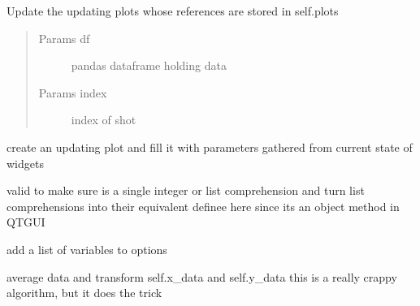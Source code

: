 \documentclass[letterpaper,10pt,english]{sphinxmanual}
\begin{document}
\begin{fulllineitems}

\begin{fulllineitems}
\label{VisualPlotter:Visualplotterwidget.VisualPlotter.update_plots}
Update the updating plots whose references are stored in self.plots
\begin{quote}\begin{description}
\item[{Params df}] \leavevmode
pandas dataframe holding data

\item[{Params index}] \leavevmode
index of shot

\end{description}\end{quote}

\end{fulllineitems}


\begin{fulllineitems}
\label{VisualPlotter:Visualplotterwidget.VisualPlotter.updating_plot}
create an updating plot and fill it with parameters 
gathered from current state of widgets

\end{fulllineitems}


\begin{fulllineitems}
\label{VisualPlotter:Visualplotterwidget.VisualPlotter.validate}
valid to make sure is a single integer or list comprehension
and turn list comprehensions into their equivalent
definee here since its an object method in QTGUI

\end{fulllineitems}


\begin{fulllineitems}
\label{VisualPlotter:Visualplotterwidget.VisualPlotter.var_push}
add a list of variables to options

\end{fulllineitems}


\begin{fulllineitems}
\label{VisualPlotter:Visualplotterwidget.VisualPlotter.verbose_avg}
average data and transform self.x\_data and self.y\_data
this is a really crappy algorithm, but it does the trick

\end{fulllineitems}


\end{fulllineitems}
\end{document}
